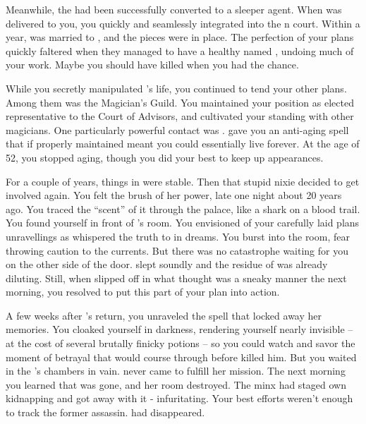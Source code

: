 \documentclass[char]{NeptuneBall}
\begin{document}
Meanwhile, the \cQueen{\kid} had been successfully converted to a sleeper agent. When \cQueen{} was delivered to you, you quickly and seamlessly integrated \cQueen{\them} into the \pAtlantis{}n court. Within a year, \cKing{} was married to \cQueen{}, and the pieces were in place. The perfection of your plans quickly faltered when they managed to have a healthy \cAriel{\offspring} named \cAriel{}, undoing much of your work. Maybe you should have killed \cKing{} when you had the chance.

While you secretly manipulated \cKing{\King} \cKing{}'s life, you continued to tend your other plans. Among them was the Magician's Guild. You maintained your position as elected representative to the Court of Advisors, and cultivated your standing with other magicians. One particularly powerful contact was \cWitch{}. \cWitch{\They} gave you an anti-aging spell that if properly maintained meant you could essentially live forever. At the age of 52, you stopped aging, though you did your best to keep up appearances.

For a couple of years, things in \pAtlantis{} were stable. Then that stupid nixie decided to get involved again. You felt the brush of her power, late one night about 20 years ago. You traced the ``scent'' of it through the palace, like a shark on a blood trail. You found yourself in front of \cQueen{}'s room. You envisioned of your carefully laid plans unravellings as \cNixie{} whispered the truth to \cQueen{} in dreams. You burst into the room, fear throwing caution to the currents. But there was no catastrophe waiting for you on the other side of the door. \cQueen{} slept soundly and the residue of \cNixie{} was already diluting. Still, when \cQueen{} slipped off in what \cQueen{\they} thought was a sneaky manner the next morning, you resolved to put this part of your plan into action.

A few weeks after \cQueen{}'s return, you unraveled the spell that locked away her memories. You cloaked yourself in darkness, rendering yourself nearly invisible -- at the cost of several brutally finicky potions -- so you could watch and savor the moment of betrayal that would course through \cKing{} before \cQueen{} killed him. But you waited in the \cKing{\King}'s chambers in vain. \cQueen{} never came to fulfill her mission. The next morning you learned that \cQueen{\they} was gone, and her room destroyed. The minx had staged \cQueen{\them} own kidnapping and got away with it - infuritating. Your best efforts weren't enough to track the former assassin. \cQueen{\They} had disappeared.
\end{document}
